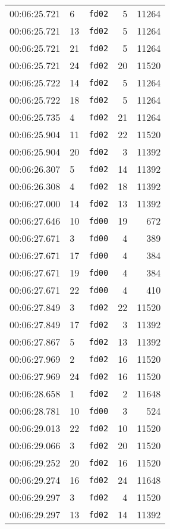 \documentclass{article}
\begin{document}
\begin{longtable}{lllrr}
00:06:25.721 & 6 & \texttt{fd02} & 5 & 11264 \\
00:06:25.721 & 13 & \texttt{fd02} & 5 & 11264 \\
00:06:25.721 & 21 & \texttt{fd02} & 5 & 11264 \\
00:06:25.721 & 24 & \texttt{fd02} & 20 & 11520 \\
00:06:25.722 & 14 & \texttt{fd02} & 5 & 11264 \\
00:06:25.722 & 18 & \texttt{fd02} & 5 & 11264 \\
00:06:25.735 & 4 & \texttt{fd02} & 21 & 11264 \\
00:06:25.904 & 11 & \texttt{fd02} & 22 & 11520 \\
00:06:25.904 & 20 & \texttt{fd02} & 3 & 11392 \\
00:06:26.307 & 5 & \texttt{fd02} & 14 & 11392 \\
00:06:26.308 & 4 & \texttt{fd02} & 18 & 11392 \\
00:06:27.000 & 14 & \texttt{fd02} & 13 & 11392 \\
00:06:27.646 & 10 & \texttt{fd00} & 19 & 672 \\
00:06:27.671 & 3 & \texttt{fd00} & 4 & 389 \\
00:06:27.671 & 17 & \texttt{fd00} & 4 & 384 \\
00:06:27.671 & 19 & \texttt{fd00} & 4 & 384 \\
00:06:27.671 & 22 & \texttt{fd00} & 4 & 410 \\
00:06:27.849 & 3 & \texttt{fd02} & 22 & 11520 \\
00:06:27.849 & 17 & \texttt{fd02} & 3 & 11392 \\
00:06:27.867 & 5 & \texttt{fd02} & 13 & 11392 \\
00:06:27.969 & 2 & \texttt{fd02} & 16 & 11520 \\
00:06:27.969 & 24 & \texttt{fd02} & 16 & 11520 \\
00:06:28.658 & 1 & \texttt{fd02} & 2 & 11648 \\
00:06:28.781 & 10 & \texttt{fd00} & 3 & 524 \\
00:06:29.013 & 22 & \texttt{fd02} & 10 & 11520 \\
00:06:29.066 & 3 & \texttt{fd02} & 20 & 11520 \\
00:06:29.252 & 20 & \texttt{fd02} & 16 & 11520 \\
00:06:29.274 & 16 & \texttt{fd02} & 24 & 11648 \\
00:06:29.297 & 3 & \texttt{fd02} & 4 & 11520 \\
00:06:29.297 & 13 & \texttt{fd02} & 14 & 11392 \\

\end{longtable}
\end{document}
